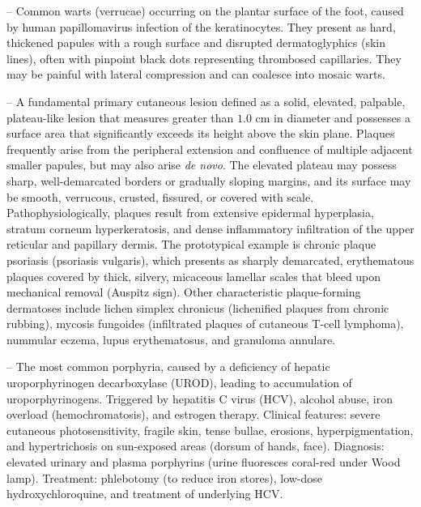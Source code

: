 -- Common warts (verrucae) occurring on the plantar surface of the foot, caused by human papillomavirus infection of the keratinocytes. They present as hard, thickened papules with a rough surface and disrupted dermatoglyphics (skin lines), often with pinpoint black dots representing thrombosed capillaries. They may be painful with lateral compression and can coalesce into mosaic warts.

-- A fundamental primary cutaneous lesion defined as a solid, elevated, palpable, plateau-like lesion that measures greater than $1.0\text{ cm}$ in diameter and possesses a surface area that significantly exceeds its height above the skin plane. Plaques frequently arise from the peripheral extension and confluence of multiple adjacent smaller papules, but may also arise \textit{de novo}. The elevated plateau may possess sharp, well-demarcated borders or gradually sloping margins, and its surface may be smooth, verrucous, crusted, fissured, or covered with scale. Pathophysiologically, plaques result from extensive epidermal hyperplasia, stratum corneum hyperkeratosis, and dense inflammatory infiltration of the upper reticular and papillary dermis. The prototypical example is chronic plaque psoriasis (psoriasis vulgaris), which presents as sharply demarcated, erythematous plaques covered by thick, silvery, micaceous lamellar scales that bleed upon mechanical removal (Auspitz sign). Other characteristic plaque-forming dermatoses include lichen simplex chronicus (lichenified plaques from chronic rubbing), mycosis fungoides (infiltrated plaques of cutaneous T-cell lymphoma), nummular eczema, lupus erythematosus, and granuloma annulare.

-- The most common porphyria, caused by a deficiency of hepatic uroporphyrinogen decarboxylase (UROD), leading to accumulation of uroporphyrinogens. Triggered by hepatitis C virus (HCV), alcohol abuse, iron overload (hemochromatosis), and estrogen therapy. Clinical features: severe cutaneous photosensitivity, fragile skin, tense bullae, erosions, hyperpigmentation, and hypertrichosis on sun-exposed areas (dorsum of hands, face). Diagnosis: elevated urinary and plasma porphyrins (urine fluoresces coral-red under Wood lamp). Treatment: phlebotomy (to reduce iron stores), low-dose hydroxychloroquine, and treatment of underlying HCV.


